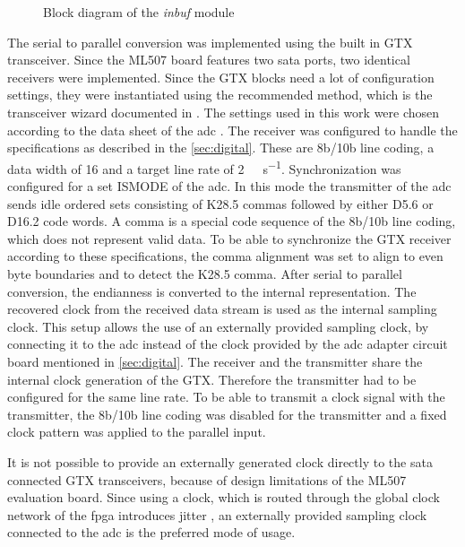 \documentclass[12pt,a4paper,parskip=full,abstract=true,BCOR=12mm,twoside,open=right]{scrreprt}
\def\device#1{\textit{#1}}
\begin{document}
\begin{figure}[htb]
    \caption{Block diagram of the \device{inbuf} module}
    \label{fig:inbuf}
\end{figure}

The serial to parallel conversion was implemented using the built in GTX
transceiver. Since the ML507 board features two \gls{sata} ports, two
identical receivers were implemented. Since the GTX blocks need
a lot of configuration settings, they were instantiated using the
recommended method, which is the transceiver wizard documented in \cite{gtx_wizard}. The
settings used in this work were chosen according to the data sheet
of the \gls{adc} \cite{ltc2274}. The receiver was configured to handle the
specifications as described in the \cref{sec:digital}. These are 8b/10b line coding,
a data width of \SI{16}{\bit} and a target line rate of \SI{2}{\giga\bit\per\second}.
Synchronization was configured for a set ISMODE of the \gls{adc}. In this mode the
transmitter of the \gls{adc} sends idle ordered sets consisting of
K28.5 commas followed by either D5.6 or D16.2 code words\cite{ltc2274}. A comma is a special
code sequence of the 8b/10b line coding, which does not represent valid data\cite{gtx}.
To be able to synchronize the GTX receiver according to these specifications, the comma
alignment was set to align to even byte boundaries and to detect the K28.5 comma. After
serial to parallel conversion, the endianness is converted to the internal representation.
The recovered clock from the received data stream is used as the internal sampling clock.
This setup allows the use of an externally provided sampling clock, by connecting it to
the \gls{adc} instead of the clock provided by the \gls{adc} adapter circuit board
mentioned in \cref{sec:digital}. The receiver and
the transmitter share the internal clock generation of the GTX. Therefore the transmitter
had to be configured for the same line rate. To be able to transmit a clock signal with the
transmitter, the 8b/10b line coding was disabled for the transmitter and a fixed clock pattern was applied
to the parallel input.

It is not possible to provide an externally generated clock directly to the
\gls{sata} connected GTX transceivers, because of design limitations of the ML507 evaluation
board. Since using a clock, which is routed through the global clock
network of the \gls{fpga} introduces jitter \cite{gtx}, an externally provided sampling clock
connected to the \gls{adc} is the preferred mode of usage.
\end{document}
